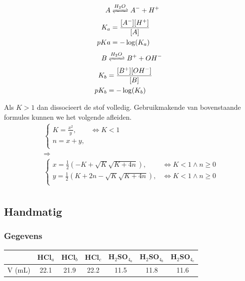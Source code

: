 \documentclass[10pt,twoside]{report}
\begin{document}
\begin{multicols}{2}
\begin{equation*}
    \begin{split}
        A &\xrightleftharpoons[]{H_2O} A^- + H^+\\
        K_a &= \frac{[A^-][H^+]}{[A]}\\
        pKa &= -\log(K_a)\\
    \end{split}
\end{equation*}
\break
\begin{equation*}
    \begin{split}
        B &\xrightleftharpoons[]{H_2O} B^+ + OH^-\\
        K_b &= \frac{[B^+][OH^-]}{[B]}\\
        pK_b &= -\log(K_b)\\
    \end{split}
\end{equation*}
\end{multicols}
Als $K > 1$ dan dissocieert de stof volledig. Gebruikmakende van bovenstaande formules kunnen we het volgende afleiden.\\
\begin{equation*}
    \begin{split}
        &\begin{cases}
            K = \frac{x^2}{y}, & \iff K < 1\\
            n = x + y, & \\
        \end{cases}\\
        &\Longrightarrow\\
        &\begin{cases}
            x = \frac{1}{2}(-K + \sqrt{K}\sqrt{K + 4n}), & \iff K < 1 \wedge n \geq 0 \\
            y = \frac{1}{2}(K + 2n - \sqrt{K}\sqrt{K + 4n}), & \iff K < 1 \wedge n \geq 0\\
        \end{cases}\\
    \end{split}
\end{equation*}

\newpage

\subsection{Handmatig}
\subsubsection{Gegevens}
\begin{tabular}{|l|c|c|c||c|c|c|}
    \hline
      & HCl$_a$ & HCl$_b$ & HCl$_c$ & H$_2$SO$_{4_a}$ & H$_2$SO$_{4_b}$ & H$_2$SO$_{4_c}$ \\\hline
    V (mL) & 22.1 & 21.9 & 22.2 & 11.5 & 11.8 & 11.6 \\\hline
\end{tabular}
\end{document}
